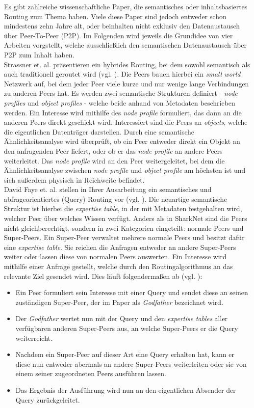 Es gibt zahlreiche wissenschaftliche Paper, die semantisches oder inhaltsbasiertes Routing zum Thema haben. Viele diese Paper sind jedoch entweder schon mindestens zehn Jahre alt, oder beinhalten nicht exklusiv den Datenaustausch über Peer-To-Peer (P2P). Im Folgenden wird jeweils die Grundidee von vier Arbeiten vorgstellt, welche ausschließlich den semantischen Datenaustausch über P2P zum Inhalt haben.\\
Strassner et. al. präsentieren ein hybrides Routing, bei dem sowohl semantisch als auch traditionell geroutet wird (vgl. \citet[S. 164ff]{Strassner2010}). Die Peers bauen hierbei ein \textit{small world} Netzwerk auf, bei dem jeder Peer viele kurze und nur wenige lange Verbindungen zu anderen Peers hat. Es werden zwei semantische Strukturen definiert - \textit{node profiles} und \textit{object profiles} - welche beide anhand von Metadaten beschrieben werden. Ein Interesse wird mithilfe des \textit{node profile} formuliert, das dann an die anderen Peers direkt geschickt wird. Interessiert sind die Peers an \textit{objects}, welche die eigentlichen Datenträger darstellen. Durch eine semantische Ähnlichkeitsanalyse wird überprüft, ob ein Peer entweder direkt ein Objekt an den anfragenden Peer liefert, oder ob er das \textit{node profile} an andere Peers weiterleitet. Das \textit{node profile} wird an den Peer weitergeleitet, bei dem die Ähnlichkeitsanalyse zwischen \textit{node profile} und \textit{object profile} am höchsten ist und sich außerdem physisch in Reichweite befindet. \\
David Faye et. al. stellen in Ihrer Ausarbeitung ein semantisches und abfrageorientiertes (Query) Routing vor (vgl. \citet[S. 365f]{Faye2007}). Die neuartige semantische Struktur ist hierbei die \textit{expertise table}, in der mit Metadaten festgehalten wird, welcher Peer über welches Wissen verfügt. Anders als in SharkNet sind die Peers nicht gleichberechtigt, sondern in zwei Kategorien eingeteilt: normale Peers und Super-Peers. Ein Super-Peer verwaltet mehrere normale Peers und besitzt dafür eine \textit{expertise table}. Sie reichen die Anfragen entweder an andere Super-Peers weiter oder lassen diese von normalen Peers auswerten. Ein Interesse wird mithilfe einer Anfrage gestellt, welche durch den Routingalgorithmus an das relevante Ziel gesendet wird. Dies läuft folgendermaßen ab (vgl. \citet[S. 370f]{Faye2007}):
\begin{itemize}
	\item Ein Peer formuliert sein Interesse mit einer Query und sendet diese an seinen zuständigen Super-Peer, der im Paper als \textit{Godfather} bezeichnet wird.
	\item Der \textit{Godfather} wertet nun mit der Query und den \textit{expertise tables} aller verfügbaren anderen Super-Peers aus, an welche Super-Peers er die Query weiterreicht.
	\item Nachdem ein Super-Peer auf dieser Art eine Query erhalten hat, kann er diese nun entweder abermals an andere Super-Peers weiterleiten oder sie von einem seiner zugeordneten Peers ausführen lassen.
	\item Das Ergebnis der Ausführung wird nun an den eigentlichen Absender der Query zurückgeleitet.
\end{itemize}
